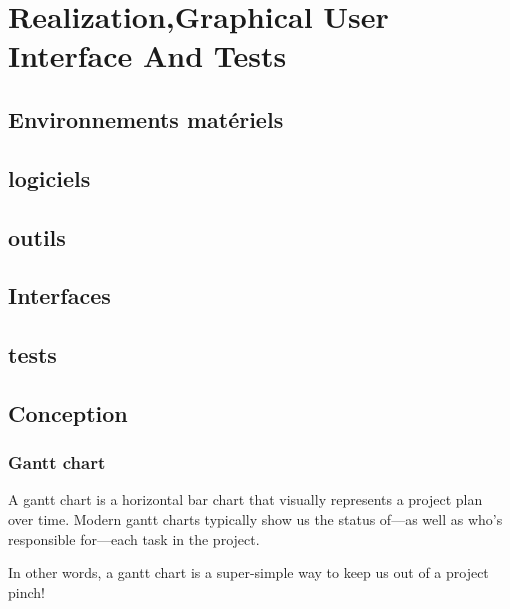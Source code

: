

\chapter{Realization,Graphical User Interface And Tests}%
\label{chap:chapter_four}

\section{Environnements matériels}
\section{logiciels}
\section{outils}
\section{Interfaces}
\section{tests}
\section{Conception}


\subsection{Gantt chart}
A gantt chart is a horizontal bar chart that visually represents a project plan over time. Modern gantt charts typically show us the status of—as well as who’s responsible for—each task in the project.

In other words, a gantt chart is a super-simple way to keep us out of a project pinch!

